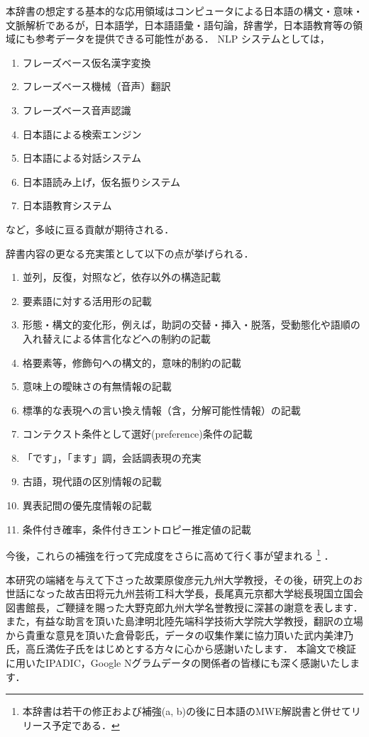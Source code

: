 \documentclass[japanese]{jnlp_1.4}
\begin{document}
本辞書の想定する基本的な応用領域はコンピュータによる日本語の構文・意味・文脈解析であるが，日本語学，日本語語彙・語句論，辞書学，日本語教育等の領域にも参考データを提供できる可能性がある．
NLP システムとしては，
\begin{enumerate}[　1.]
\item フレーズベース仮名漢字変換
\item フレーズベース機械（音声）翻訳
\item フレーズベース音声認識
\item 日本語による検索エンジン
\item 日本語による対話システム
\item 日本語読み上げ，仮名振りシステム
\item 日本語教育システム
\end{enumerate}
など，多岐に亘る貢献が期待される．

辞書内容の更なる充実策として以下の点が挙げられる．
\begin{enumerate}[　a.]
\item 並列，反復，対照など，依存以外の構造記載
\item 要素語に対する活用形の記載
\item 形態・構文的変化形，例えば，助詞の交替・挿入・脱落，受動態化や語順の入れ替えによる体言化などへの制約の記載
\item 格要素等，修飾句への構文的，意味的制約の記載
\item 意味上の曖昧さの有無情報の記載
\item 標準的な表現への言い換え情報（含，分解可能性情報）の記載
\item コンテクスト条件として選好(preference)条件の記載
\item 「です」，「ます」調，会話調表現の充実
\item 古語，現代語の区別情報の記載
\item 異表記間の優先度情報の記載
\item 条件付き確率，条件付きエントロピー推定値の記載
\end{enumerate}

今後，これらの補強を行って完成度をさらに高めて行く事が望まれる
\footnote{本辞書は若干の修正および補強(a, b)の後に日本語のMWE解説書と併せてリリース予定である．}
．





\nocite{*}


\acknowledgment
本研究の端緒を与えて下さった故栗原俊彦元九州大学教授，その後，研究上のお世話になった故吉田将元九州芸術工科大学長，長尾真元京都大学総長現国立国会図書館長，ご鞭撻を賜った大野克郎九州大学名誉教授に深甚の謝意を表します． また，有益な助言を頂いた島津明北陸先端科学技術大学院大学教授，翻訳の立場から貴重な意見を頂いた倉骨彰氏，データの収集作業に協力頂いた武内美津乃氏，高丘満佐子氏をはじめとする方々に心から感謝いたします．
本論文で検証に用いたIPADIC，Google Nグラムデータの関係者の皆様にも深く感謝いたします．
\end{document}
